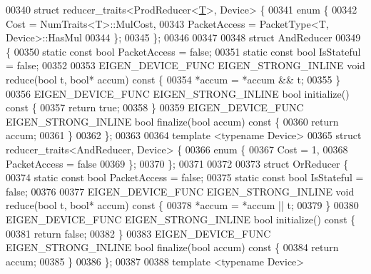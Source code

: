 \begin{DoxyCode}
00340 \textcolor{keyword}{struct }reducer\_traits<ProdReducer<\hyperlink{group___sparse_core___module_class_eigen_1_1_triplet}{T}>, Device> \{
00341   \textcolor{keyword}{enum} \{
00342     Cost = NumTraits<T>::MulCost,
00343     PacketAccess = PacketType<T, Device>::HasMul
00344   \};
00345 \};
00346 
00347 
00348 \textcolor{keyword}{struct }AndReducer
00349 \{
00350   \textcolor{keyword}{static} \textcolor{keyword}{const} \textcolor{keywordtype}{bool} PacketAccess = \textcolor{keyword}{false};
00351   \textcolor{keyword}{static} \textcolor{keyword}{const} \textcolor{keywordtype}{bool} IsStateful = \textcolor{keyword}{false};
00352 
00353   EIGEN\_DEVICE\_FUNC EIGEN\_STRONG\_INLINE \textcolor{keywordtype}{void} reduce(\textcolor{keywordtype}{bool} t, \textcolor{keywordtype}{bool}* accum)\textcolor{keyword}{ const }\{
00354     *accum = *accum && t;
00355   \}
00356   EIGEN\_DEVICE\_FUNC EIGEN\_STRONG\_INLINE \textcolor{keywordtype}{bool} initialize()\textcolor{keyword}{ const }\{
00357     \textcolor{keywordflow}{return} \textcolor{keyword}{true};
00358   \}
00359   EIGEN\_DEVICE\_FUNC EIGEN\_STRONG\_INLINE \textcolor{keywordtype}{bool} finalize(\textcolor{keywordtype}{bool} accum)\textcolor{keyword}{ const }\{
00360     \textcolor{keywordflow}{return} accum;
00361   \}
00362 \};
00363 
00364 \textcolor{keyword}{template} <\textcolor{keyword}{typename} Device>
00365 \textcolor{keyword}{struct }reducer\_traits<AndReducer, Device> \{
00366   \textcolor{keyword}{enum} \{
00367     Cost = 1,
00368     PacketAccess = \textcolor{keyword}{false}
00369   \};
00370 \};
00371 
00372 
00373 \textcolor{keyword}{struct }OrReducer \{
00374   \textcolor{keyword}{static} \textcolor{keyword}{const} \textcolor{keywordtype}{bool} PacketAccess = \textcolor{keyword}{false};
00375   \textcolor{keyword}{static} \textcolor{keyword}{const} \textcolor{keywordtype}{bool} IsStateful = \textcolor{keyword}{false};
00376 
00377   EIGEN\_DEVICE\_FUNC EIGEN\_STRONG\_INLINE \textcolor{keywordtype}{void} reduce(\textcolor{keywordtype}{bool} t, \textcolor{keywordtype}{bool}* accum)\textcolor{keyword}{ const }\{
00378     *accum = *accum || t;
00379   \}
00380   EIGEN\_DEVICE\_FUNC EIGEN\_STRONG\_INLINE \textcolor{keywordtype}{bool} initialize()\textcolor{keyword}{ const }\{
00381     \textcolor{keywordflow}{return} \textcolor{keyword}{false};
00382   \}
00383   EIGEN\_DEVICE\_FUNC EIGEN\_STRONG\_INLINE \textcolor{keywordtype}{bool} finalize(\textcolor{keywordtype}{bool} accum)\textcolor{keyword}{ const }\{
00384     \textcolor{keywordflow}{return} accum;
00385   \}
00386 \};
00387 
00388 \textcolor{keyword}{template} <\textcolor{keyword}{typename} Device>

\end{DoxyCode}
